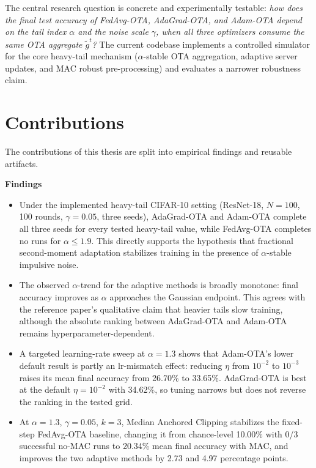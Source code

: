The central research question is concrete and experimentally testable:
\emph{how does the final test accuracy of FedAvg-OTA,
AdaGrad-OTA, and Adam-OTA depend on the tail index $\alpha$ and the
noise scale $\gamma$, when all three optimizers consume the same OTA
aggregate $\tilde{g}^t$?} The current codebase implements a controlled simulator for the core
heavy-tail mechanism ($\alpha$-stable OTA aggregation, adaptive server
updates, and MAC robust pre-processing) and evaluates a narrower
robustness claim.

\section{Contributions}
The contributions of this thesis are split into empirical findings and
reusable artifacts.

\noindent\textbf{Findings}
\begin{itemize}
    \item Under the implemented heavy-tail CIFAR-10 setting
    (ResNet-18, $N=100$, 100 rounds, $\gamma=0.05$, three seeds),
    AdaGrad-OTA and Adam-OTA complete all three seeds for every tested
    heavy-tail value, while FedAvg-OTA completes no runs
    for $\alpha\leq1.9$.
    This directly supports the hypothesis that fractional second-moment
    adaptation stabilizes training in the presence of $\alpha$-stable
    impulsive noise.
    \item The observed $\alpha$-trend for the adaptive methods is
    broadly monotone: final accuracy improves as $\alpha$ approaches the
    Gaussian endpoint. This agrees with the reference paper's qualitative
    claim that heavier tails slow training, although the absolute ranking
    between AdaGrad-OTA and Adam-OTA remains hyperparameter-dependent.
    \item A targeted learning-rate sweep at $\alpha=1.3$ shows that
    Adam-OTA's lower default result is partly an lr-mismatch effect:
    reducing $\eta$ from $10^{-2}$ to $10^{-3}$ raises its mean final
    accuracy from 26.70\% to 33.65\%. AdaGrad-OTA is best at the default
    $\eta=10^{-2}$ with 34.62\%, so tuning narrows but does not reverse
    the ranking in the tested grid.
    \item At $\alpha=1.3$, $\gamma=0.05$, $k=3$, Median Anchored
    Clipping stabilizes the fixed-step FedAvg-OTA baseline, changing it
    from chance-level 10.00\% with 0/3 successful no-MAC runs to
    20.34\% mean final accuracy with MAC, and improves the two adaptive
    methods by 2.73 and 4.97 percentage points.
\end{itemize}

